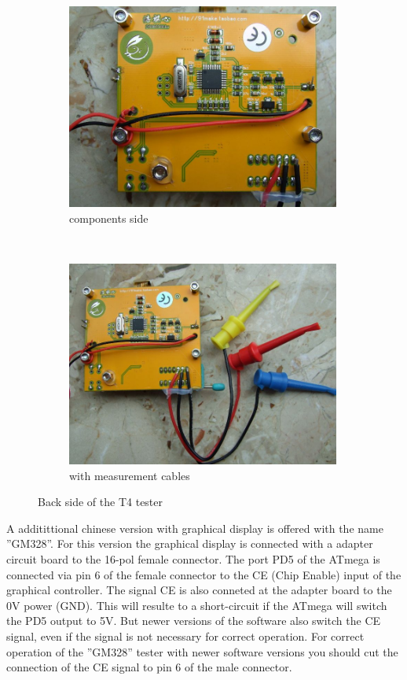 \begin{figure}[H]
  \begin{subfigure}[b]{9cm}
    \centering
    \includegraphics[width=9cm]{../PNG/T4_back.JPG}
    \caption{components side}
  \end{subfigure}
  ~
  \begin{subfigure}[b]{9cm}
    \centering
    \includegraphics[width=9cm]{../PNG/T4_back_clips.JPG}
    \caption{with measurement cables}
  \end{subfigure}
  \caption{Back side of the T4 tester}
  \label{fig:T4_back}
\end{figure}

A additittional chinese version with graphical display is offered with the name ''GM328''.
For this version the graphical display is connected with a adapter circuit board to the 16-pol female connector. 
The port PD5 of the ATmega is connected via pin 6 of the female connector to the CE (Chip Enable) input of the 
graphical controller.
The signal CE is also conneted at the adapter board to the 0V power (GND).
This will resulte to a short-circuit if the ATmega will switch the PD5 output to 5V.
But newer versions of the software also switch the CE signal, even if the signal is not necessary for
correct operation.
For correct operation of the ''GM328'' tester with newer software versions you should cut the
connection of the CE signal to pin 6 of the male connector.


